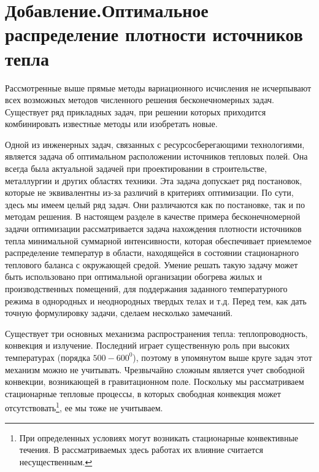 \section*{ \sloppy \center Добавление.Оптимальное распределение плотности источников тепла }
\sloppy
\emergencystretch=20pt
\setcounter{section}{5} %
\setcounter{subsection}{0}
\setcounter{equation}{0}
\renewcommand{\thesubsection}{\Asbuk{section}.\arabic{subsection}}
\renewcommand{\theequation}{\Asbuk{section}.\arabic{equation}}

 Рассмотренные выше прямые методы вариационного исчисления не исчерпывают всех возможных методов численного решения бесконечномерных задач.
Существует ряд прикладных задач, при решении которых приходится комбинировать известные методы или изобретать новые.

Одной из инженерных задач, связанных с ресурсосберегающими технологиями, является задача об оптимальном расположении источников тепловых полей. Она всегда была актуальной задачей при проектировании в строительстве, металлургии и других областях техники. Эта задача допускает ряд постановок, которые не эквивалентны из-за различий в критериях оптимизации. По сути, здесь мы имеем целый ряд задач. Они различаются как по постановке, так и по методам решения. В настоящем разделе в качестве примера бесконечномерной задачи оптимизации рассматривается задача нахождения плотности источников тепла минимальной суммарной интенсивности, которая обеспечивает приемлемое распределение температур в области, находящейся в состоянии стационарного теплового баланса с окружающей средой. Умение решать такую задачу может быть использовано при оптимальной организации обогрева жилых и производственных помещений, для поддержания заданного температурного режима в однородных и неоднородных твердых телах и т.д. Перед тем, как дать точную формулировку задачи, сделаем несколько замечаний.

Существует три основных механизма распространения тепла: теплопроводность, конвекция и излучение. Последний играет существенную роль при высоких температурах (порядка $500-600^0 $), поэтому в упомянутом выше круге задач этот механизм можно не учитывать. Чрезвычайно сложным является учет свободной конвекции, возникающей в гравитационном поле. Поскольку мы рассматриваем стационарные тепловые процессы, в которых свободная конвекция может
 отсутствовать\footnote{  При определенных условиях могут возникать стационарные конвективные течения. В рассматриваемых здесь работах их влияние считается несущественным.}, ее мы тоже не учитываем.

